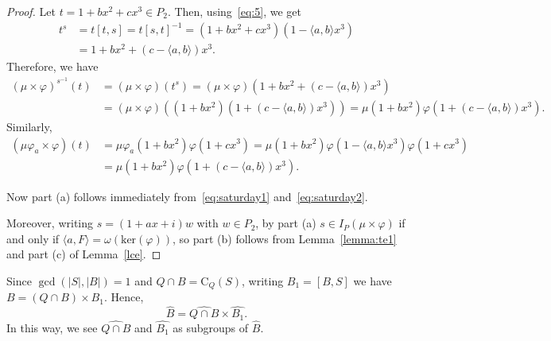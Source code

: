 \documentclass{amsart}
\def\cent#1#2{\mathrm{C}_{{#1}}{{(#2)}}}
\begin{document}
\begin{proof}
 Let $t=1+b x^2+cx^3\in P_2$. Then,
using~\eqref{eq:5}, we get
\begin{align*}
t^s&=t[t,s] = t[s,t]^{-1}=(1+b x^2+cx^3)(1 -\langle a,b\rangle x^3)\\
&=1+b x^2+(c- \langle a,b\rangle )x^3.
\end{align*} Therefore, we have
\begin{align}\label{eq:saturday1}
(\mu\times \varphi)^{s^{-1}}(t)&=(\mu\times \varphi)(t^s)=(\mu\times \varphi)(1+b x^2+(c-\langle a,b\rangle )x^3)\\\nonumber
&=(\mu\times \varphi)((1+b x^2)(1+(c-\langle a,b\rangle )x^3))
=\mu(1+b x^2)\varphi(1+(c-\langle a,b\rangle )x^3).
\end{align}
Similarly,
\begin{align}\label{eq:saturday2}
(\mu\varphi_a\times \varphi)(t)&=\mu\varphi_a(1+b x^2)\varphi(1+cx^3)=\mu(1+b x^2)\varphi(1-\langle a,b\rangle x^3)\varphi(1+c x^3)\\\nonumber
&=\mu(1+b x^2)\varphi(1+(c-\langle a,b\rangle)x^3).
\end{align}

Now part (a) follows immediately from~\eqref{eq:saturday1} and~\eqref{eq:saturday2}.

Moreover, writing  $s=(1+a x+i)w$ with $w \in P_2$, by part (a)  $s \in I_P(\mu \times \varphi)$ if and only if
$\langle a, F \rangle = \omega(\mathrm{ker}(\varphi))$, so part (b) follows from Lemma~\ref{lemma:te1} and part (c) of Lemma~\ref{lce}.
\end{proof}


Since  $\gcd(|S|,|B|)=1$ and $Q \cap B = \cent QS$, writing $B_1 = [B,S]$ we have
$B=(Q\cap B)\times B_1$.
Hence,
\begin{equation}\label{eq:direct}\widehat{B} = \widehat{Q\cap B}\times \widehat{B_1}. \end{equation}
In this way,  we see $\widehat{Q\cap B}$ and $\widehat{B_1}$ as  subgroups of $\widehat{B}$.
\end{document}
